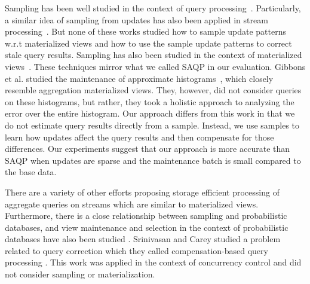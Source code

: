 Sampling has been well studied in the context of query processing~\cite{AgarwalMPMMS13, olken1993random, garofalakis2001approximate}. Particularly, a similar idea of sampling from updates has also been applied in stream processing~\cite{tatbul2003load, Garofalakis, rabkin2014aggregation}. But none of these works studied how to sample update patterns w.r.t materialized views and how to use the sample update patterns to correct stale query results.
Sampling has also been studied in the context of materialized views~\cite{joshi2008materialized,DBLP:conf/icde/OlkenR92}.
These techniques mirror what we called SAQP in our evaluation.
Gibbons et al. studied the maintenance of approximate histograms~\cite{gibbons1997fast}, which closely resemble aggregation materialized views.
They, however, did not consider queries on these histograms, but rather, they took a holistic approach to analyzing the error over the entire histogram.
Our approach differs from this work in that we do not estimate query results directly from a sample. 
Instead, we use samples to learn how updates affect the query results and then compensate for those differences. 
Our experiments suggest that our approach is more accurate than SAQP when updates are sparse and the maintenance batch is small compared to the base data.

There are a variety of other efforts proposing storage efficient processing of aggregate queries on streams \cite{dobra2002processing, greenwald2001space} which are similar to materialized views. Furthermore, there is a close relationship between sampling and probabilistic databases, and view maintenance and selection in the context of probabilistic databases have also been studied \cite{re2007materialized}.
Srinivasan and Carey studied a problem related to query correction which they called compensation-based query processing \cite{srinivasanC92}.
This work was applied in the context of concurrency control and did not consider sampling or materialization.

